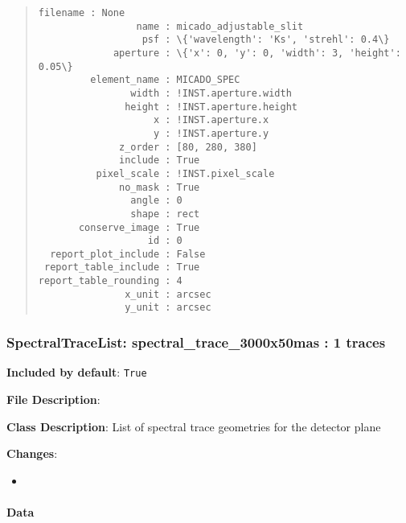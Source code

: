 \begin{quote}
\begin{alltt}
\begin{lstlisting}[frame=single]
             filename : None
                 name : micado_adjustable_slit
                  psf : \{'wavelength': 'Ks', 'strehl': 0.4\}
             aperture : \{'x': 0, 'y': 0, 'width': 3, 'height': 0.05\}
         element_name : MICADO_SPEC
                width : !INST.aperture.width
               height : !INST.aperture.height
                    x : !INST.aperture.x
                    y : !INST.aperture.y
              z_order : [80, 280, 380]
              include : True
          pixel_scale : !INST.pixel_scale
              no_mask : True
                angle : 0
                shape : rect
       conserve_image : True
                   id : 0
  report_plot_include : False
 report_table_include : True
report_table_rounding : 4
               x_unit : arcsec
               y_unit : arcsec
\end{lstlisting}
\end{alltt}
\end{quote}


\subsubsection{SpectralTraceList: \textquotedbl{}spectral\_trace\_3000x50mas\textquotedbl{} : 1 traces%
  \label{spectraltracelist-spectral-trace-3000x50mas-1-traces}%
}

\textbf{Included by default}: \texttt{True}

\textbf{File Description}:

\textbf{Class Description}: List of spectral trace geometries for the detector plane

\textbf{Changes}:

\begin{itemize}
\item \end{itemize}


\paragraph{Data%
  \label{id1}%
}

\begin{figure}[H]
\noindent{}\label{fig-spectral-trace-3000x50mas}
\end{figure}


